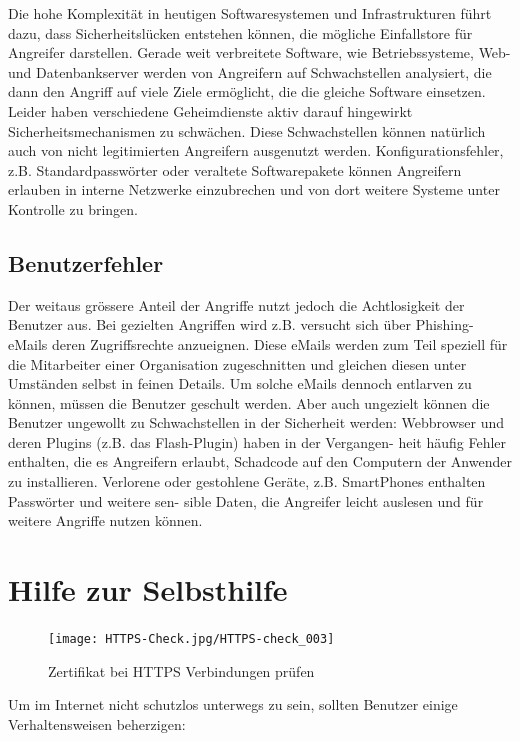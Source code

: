 \documentclass[10pt,foldmark,tumble]{leaflet}
\begin{document}
Die hohe Komplexität in heutigen Softwaresystemen und Infrastrukturen führt dazu, dass
Sicherheitslücken entstehen können, die mögliche Einfallstore für Angreifer darstellen. 
Gerade weit verbreitete Software, wie Betriebssysteme, Web- und Datenbankserver werden 
von Angreifern auf Schwachstellen analysiert, die dann den Angriff auf viele Ziele 
ermöglicht, die die gleiche Software einsetzen. Leider haben verschiedene Geheimdienste 
aktiv darauf hingewirkt Sicherheitsmechanismen zu schwächen. Diese Schwachstellen können 
natürlich auch von nicht legitimierten Angreifern ausgenutzt werden.
Konfigurationsfehler, z.B. Standardpasswörter oder veraltete Softwarepakete können 
Angreifern erlauben in interne Netzwerke einzubrechen und von dort weitere Systeme unter
Kontrolle zu bringen.

\subsection{Benutzerfehler}

Der weitaus grössere Anteil der Angriffe nutzt jedoch die Achtlosigkeit der Benutzer aus. 
Bei gezielten Angriffen wird z.B. versucht sich über Phishing-eMails deren Zugriffsrechte 
anzueignen. Diese eMails werden zum Teil speziell für die Mitarbeiter einer Organisation 
zugeschnitten und gleichen diesen unter Umständen selbst in feinen Details. Um solche eMails 
dennoch entlarven zu können, müssen die Benutzer geschult werden.
Aber auch ungezielt können die Benutzer ungewollt zu Schwachstellen in der Sicherheit
werden: Webbrowser und deren Plugins (z.B. das Flash-Plugin) haben in der Vergangen-
heit häufig Fehler enthalten, die es Angreifern erlaubt, Schadcode auf den Computern der
Anwender zu installieren.
Verlorene oder gestohlene Geräte, z.B. SmartPhones enthalten Passwörter und weitere sen-
sible Daten, die Angreifer leicht auslesen und für weitere Angriffe nutzen können.

\section{Hilfe zur Selbsthilfe}

\begin{figure}
\centering
\texttt{[image: HTTPS-Check.jpg/HTTPS-check\_003]}
\caption{Zertifikat bei HTTPS Verbindungen prüfen}
\label{sslcert}
\end{figure}

Um im Internet nicht schutzlos unterwegs zu sein, sollten Benutzer einige Verhaltensweisen
beherzigen:
\end{document}
